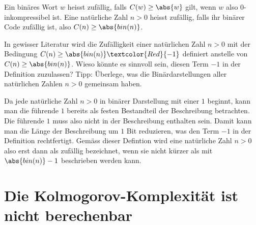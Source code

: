 \begin{mydefinition}\label{mydefinition:zufall}
\leavevmode
Ein binäres Wort $w$ heisst zufällig, falls $C(w)\geq\abs{w}$ gilt, wenn $w$ also $0$-inkompressibel ist. Eine natürliche Zahl $n>0$ heisst zufällig, falls ihr binärer Code zufällig ist, also $C(n)\geq\abs{bin(n)}$.
\end{mydefinition}

\begin{myexercise}
	\leavevmode
	In gewisser Literatur wird die Zufälligkeit einer natürlichen Zahl $n>0$ mit der Bedingung $C(n)\geq\abs{bin(n)} \textcolor{Red}{- 1}$ definiert anstelle von $C(n)\geq\abs{bin(n)}$. Wieso könnte es sinnvoll sein, diesen Term $-1$ in der Definition zuzulassen? Tipp: Überlege, was die Binärdarstellungen aller natürlichen Zahlen $n>0$ gemeinsam haben.
	\begin{myanswer}
		Da jede natürliche Zahl $n>0$ in binärer Darstellung mit einer $1$ beginnt, kann man die führende $1$ bereits als festen Bestandteil der Beschreibung betrachten. Die führende $1$ muss also nicht in der Beschreibung enthalten sein. Damit kann man die Länge der Beschreibung um $1$ Bit reduzieren, was den Term $-1$ in der Definition rechtfertigt. Gemäss dieser Defintion wird eine natürliche Zahl $n>0$ also erst dann als zufällig bezeichnet, wenn sie nicht kürzer als mit $\abs{bin(n)}-1$ beschrieben werden kann.
	\end{myanswer}
\end{myexercise}

\clearpage
\section{Die Kolmogorov-Komplexität ist nicht berechenbar}

